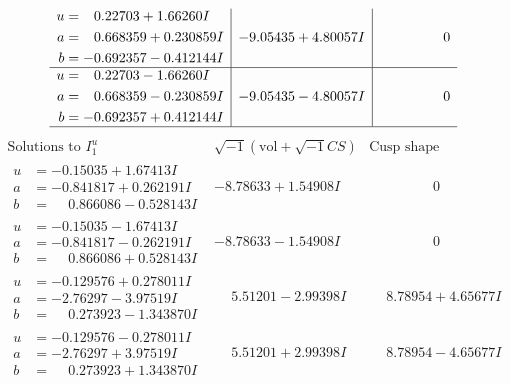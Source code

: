 \documentclass[1p]{elsarticle_modified}
\theoremstyle{definition}
\newcommand{\I}{\sqrt{-1}}
\begin{document}
$$\begin{array}{c|c|c}
\begin{aligned}
u &= \phantom{-}0.22703 + 1.66260 I \\
a &= \phantom{-}0.668359 + 0.230859 I \\
b &= -0.692357 - 0.412144 I\end{aligned}
 & -9.05435 + 4.80057 I & \phantom{-0.000000 } 0 \\ \hline\begin{aligned}
u &= \phantom{-}0.22703 - 1.66260 I \\
a &= \phantom{-}0.668359 - 0.230859 I \\
b &= -0.692357 + 0.412144 I\end{aligned}
 & -9.05435 - 4.80057 I & \phantom{-0.000000 } 0\\
 \hline 
 \end{array}$$\newpage$$\begin{array}{c|c|c}  
\text{Solutions to }I^u_{1}& \I (\text{vol} + \sqrt{-1}CS) & \text{Cusp shape}\\
 \hline 
\begin{aligned}
u &= -0.15035 + 1.67413 I \\
a &= -0.841817 + 0.262191 I \\
b &= \phantom{-}0.866086 - 0.528143 I\end{aligned}
 & -8.78633 + 1.54908 I & \phantom{-0.000000 } 0 \\ \hline\begin{aligned}
u &= -0.15035 - 1.67413 I \\
a &= -0.841817 - 0.262191 I \\
b &= \phantom{-}0.866086 + 0.528143 I\end{aligned}
 & -8.78633 - 1.54908 I & \phantom{-0.000000 } 0 \\ \hline\begin{aligned}
u &= -0.129576 + 0.278011 I \\
a &= -2.76297 - 3.97519 I \\
b &= \phantom{-}0.273923 - 1.343870 I\end{aligned}
 & \phantom{-}5.51201 - 2.99398 I & \phantom{-}8.78954 + 4.65677 I \\ \hline\begin{aligned}
u &= -0.129576 - 0.278011 I \\
a &= -2.76297 + 3.97519 I \\
b &= \phantom{-}0.273923 + 1.343870 I\end{aligned}
 & \phantom{-}5.51201 + 2.99398 I & \phantom{-}8.78954 - 4.65677 I \\ \hline\begin{aligned}

\end{aligned}
\end{array}$$
\end{document}

